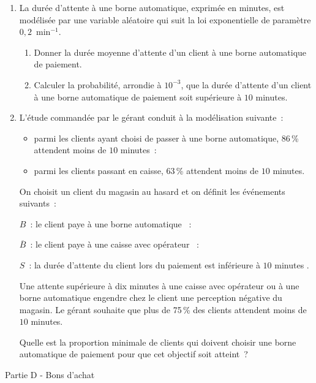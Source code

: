 \begin{enumerate}
     \item La durée d'attente à une borne automatique, exprimée en minutes, est modélisée par une
     variable aléatoire qui suit la loi exponentielle de paramètre $0,2$~min$^{-1}$.
     \begin{enumerate}[label=\alph*.]
          \item Donner la durée moyenne d'attente d'un client à une borne automatique de paiement.
          \item Calculer la probabilité, arrondie à $10^{-3}$, que la durée d'attente d'un client à une borne automatique de paiement soit supérieure à $10$ minutes.
     \end{enumerate}
     \item L'étude commandée par le gérant conduit à la modélisation suivante~:
     \begin{indent}
          \begin{itemize}
               \item parmi les clients ayant choisi de passer à une borne automatique, 86\,\% attendent moins de $10$ minutes~:
               \item parmi les clients passant en caisse, 63\,\% attendent moins de $10$ minutes.
          \end{itemize}
     \end{indent}
     \medskip
     On choisit un client du magasin au hasard et on définit les événements suivants~:
     \par
     $B$~: \og le client paye à une borne automatique \fg{}~:
     \par
     $\overline{B}$~: \og le client paye à une caisse avec opérateur \fg{}~:
     \par
     $S$~: \og la durée d'attente du client lors du paiement est inférieure à $10$ minutes \fg.
     \par
     Une attente supérieure à dix minutes à une caisse avec opérateur ou à une borne automatique
     engendre chez le client une perception négative du magasin. Le gérant souhaite que
     plus de 75\,\% des clients attendent moins de $10$ minutes.
     \par
     Quelle est la proportion minimale de clients qui doivent choisir une borne automatique de
     paiement pour que cet objectif soit atteint~?
\end{enumerate}
\bigskip
\begin{center}\begin{h3}Partie D - Bons d'achat \end{h3}\end{center}
